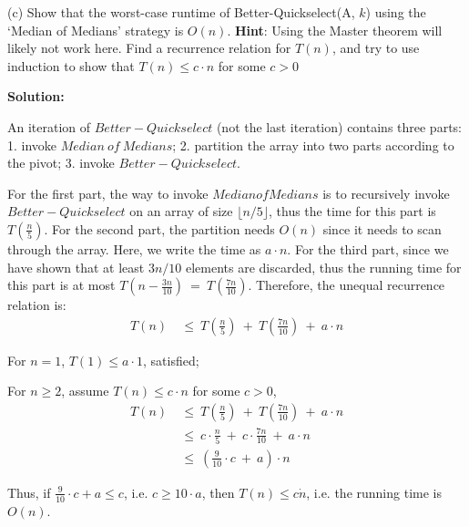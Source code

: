 \documentclass{article}
\begin{document}
(c) Show that the worst-case runtime of Better-Quickselect(A, $k$) using the ‘Median of
Medians’ strategy is $O(n)$.
{\textbf{Hint}}: Using the Master theorem will likely not work here. Find a recurrence relation for
$T(n)$, and try to use induction to show that $T(n) \leq c \cdot n$ for some $c > 0$
{\color{blue}
\par\textbf{Solution: }
\par An iteration of $Better-Quickselect$ (not the last iteration) contains three parts: 1. invoke $Median\ of\ Medians$; 2. partition the array into two parts according to the pivot; 3. invoke $Better-Quickselect$. 
\par For the first part, the way to invoke $Median of Medians$ is to recursively invoke $Better-Quickselect$ on an array of size $\lfloor n/5\rfloor$, thus the time for this part is $T(\frac{n}{5})$. For the second part, the partition needs $O(n)$ since it needs to scan through the array. Here, we write the time as $a\cdot n$. For the third part, since we have shown that at least $3n/10$ elements are discarded, thus the running time for this part is at most $T(n-\frac{3n}{10})\ =\ T(\frac{7n}{10})$. Therefore, the unequal recurrence relation is:
\begin{align*}
	T(n)\ &\leq\ T(\frac{n}{5})\ +\ T(\frac{7n}{10})\ +\ a\cdot n 
\end{align*}
\par For $n = 1$, $T(1) \leq a\cdot 1$, satisfied;
\par For $n \geq 2$, assume $T(n)\leq c\cdot n$ for some $c>0$,
\begin{align*}
	T(n)\ &\leq\ T(\frac{n}{5})\ +\ T(\frac{7n}{10})\ +\ a\cdot n\\
		   &\leq\ c\cdot \frac{n}{5}\ +\ c\cdot \frac{7n}{10}\ +\ a\cdot n\\
		   &\leq\ (\frac{9}{10}\cdot c\ +\ a)\cdot n
\end{align*}
\par Thus, if $\frac{9}{10}\cdot c + a \leq c$, i.e. $c \geq 10\cdot a$, then $T(n) \leq c\dot n$, i.e. the running time is $O(n)$. 
}
\pagebreak
\end{document}
